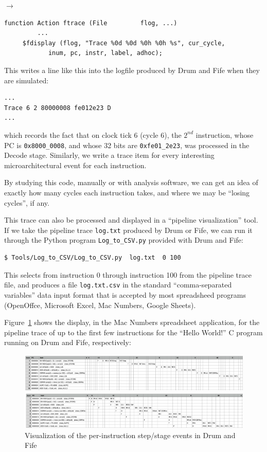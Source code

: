 $\longrightarrow$

{\small
\begin{Verbatim}[frame=single, label=src\_Common/Utils.bsv]
function Action ftrace (File         flog, ...)
         ...
	 $fdisplay (flog, "Trace %0d %0d %0h %0h %s", cur_cycle,
		    inum, pc, instr, label, adhoc);
\end{Verbatim}
}

This writes a line like this into the logfile produced by Drum and
Fife when they are simulated:

{\small
\begin{Verbatim}[frame=single, label=log.txt]
...
Trace 6 2 80000008 fe012e23 D
...
\end{Verbatim}
}

which records the fact that on clock tick 6 (cycle 6), the $2^{nd}$
instruction, whose PC is \verb|0x8000_0008|, and whose 32 bits are
\verb|0xfe01_2e23|, was processed in the Decode stage.  Similarly, we
write a trace item for every interesting microarchitectural event for
each instruction.

By studying this code, manually or with analysis software, we can get
an idea of exactly how many cycles each instruction takes, and where
we may be ``losing cycles'', if any.

This trace can also be processed and displayed in a ``pipeline
visualization'' tool.  If we take the pipeline trace \verb|log.txt|
produced by Drum or Fife, we can run it through the Python program
\verb|Log_to_CSV.py| provided with Drum and Fife:

{\small
\begin{Verbatim}[frame=single, label=log.txt]
  $ Tools/Log_to_CSV/Log_to_CSV.py  log.txt  0 100
\end{Verbatim}
}

This selects from instruction 0 through instruction 100 from the
pipeline trace file, and produces a file \verb|log.txt.csv| in the
standard ``comma-separated variables'' data input format that is
accepted by most spreadsheed programs (OpenOffce, Microsoft Excel, Mac
Numbers, Google Sheets).

Figure~\ref{Fig_PipeViz} shows the display, in the Mac Numbers
spreadsheet application, for the pipeline trace of up to the first few
instructions for the ``Hello World!'' C program running on Drum and
Fife, respectively:
\begin{figure}[htbp]
  \centerline{\includegraphics[width=6in,angle=0]{Figures/Fig_PipeViz_Drum}}
  \centerline{\includegraphics[width=6in,angle=0]{Figures/Fig_PipeViz_Fife}}
  \caption{\label{Fig_PipeViz}
           Visualization of the per-instruction step/stage events in Drum and Fife}
\end{figure}

